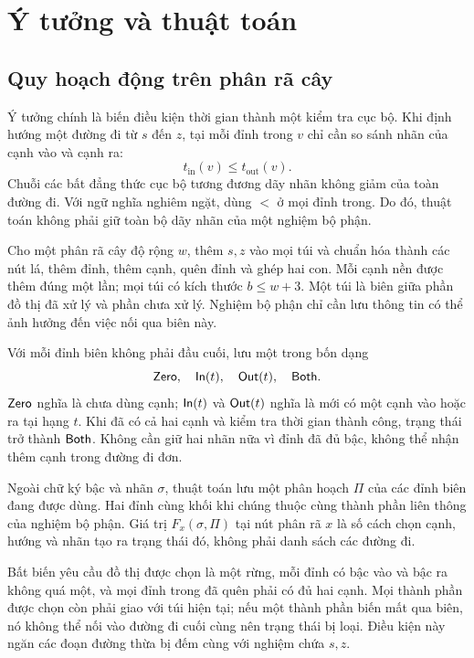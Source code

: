 \chapter{Ý tưởng và thuật toán}
\label{chap:algorithms}

\section{Quy hoạch động trên phân rã cây}

Ý tưởng chính là biến điều kiện thời gian thành một kiểm tra cục bộ. Khi định hướng một đường đi từ $s$ đến $z$, tại mỗi đỉnh trong $v$ chỉ cần so sánh nhãn của cạnh vào và cạnh ra:
\begin{equation}
  t_{\mathrm{in}}(v)\le t_{\mathrm{out}}(v).
  \label{eq:local-time}
\end{equation}
Chuỗi các bất đẳng thức cục bộ tương đương dãy nhãn không giảm của toàn đường đi. Với ngữ nghĩa nghiêm ngặt, dùng $<$ ở mọi đỉnh trong. Do đó, thuật toán không phải giữ toàn bộ dãy nhãn của một nghiệm bộ phận.

Cho một phân rã cây độ rộng $w$, thêm $s,z$ vào mọi túi và chuẩn hóa thành các nút lá, thêm đỉnh, thêm cạnh, quên đỉnh và ghép hai con. Mỗi cạnh nền được thêm đúng một lần; mọi túi có kích thước $b\le w+3$. Một túi là biên giữa phần đồ thị đã xử lý và phần chưa xử lý. Nghiệm bộ phận chỉ cần lưu thông tin có thể ảnh hưởng đến việc nối qua biên này.

Với mỗi đỉnh biên không phải đầu cuối, lưu một trong bốn dạng
\[
  \mathsf{Zero},\quad \mathsf{In}(t),\quad \mathsf{Out}(t),\quad \mathsf{Both}.
\]
$\mathsf{Zero}$ nghĩa là chưa dùng cạnh; $\mathsf{In}(t)$ và $\mathsf{Out}(t)$ nghĩa là mới có một cạnh vào hoặc ra tại hạng $t$. Khi đã có cả hai cạnh và kiểm tra thời gian thành công, trạng thái trở thành $\mathsf{Both}$. Không cần giữ hai nhãn nữa vì đỉnh đã đủ bậc, không thể nhận thêm cạnh trong đường đi đơn.

Ngoài chữ ký bậc và nhãn $\sigma$, thuật toán lưu một phân hoạch $\Pi$ của các đỉnh biên đang được dùng. Hai đỉnh cùng khối khi chúng thuộc cùng thành phần liên thông của nghiệm bộ phận. Giá trị $F_x(\sigma,\Pi)$ tại nút phân rã $x$ là số cách chọn cạnh, hướng và nhãn tạo ra trạng thái đó, không phải danh sách các đường đi.

Bất biến yêu cầu đồ thị được chọn là một rừng, mỗi đỉnh có bậc vào và bậc ra không quá một, và mọi đỉnh trong đã quên phải có đủ hai cạnh. Mọi thành phần được chọn còn phải giao với túi hiện tại; nếu một thành phần biến mất qua biên, nó không thể nối vào đường đi cuối cùng nên trạng thái bị loại. Điều kiện này ngăn các đoạn đường thừa bị đếm cùng với nghiệm chứa $s,z$.

